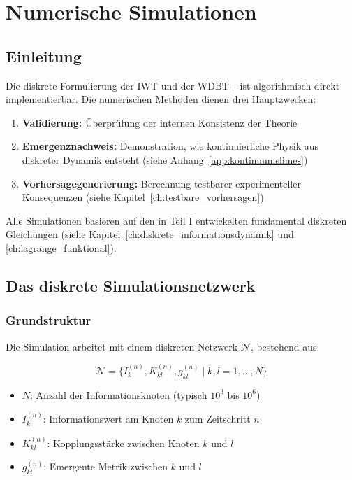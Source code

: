 
\chapter{Numerische Simulationen}
\label{app:numerik}

\section{Einleitung}
\label{app:numerik_einleitung}

Die diskrete Formulierung der IWT und der WDBT+ ist algorithmisch direkt implementierbar. Die numerischen Methoden dienen drei Hauptzwecken:

\begin{enumerate}
    \item \textbf{Validierung:} Überprüfung der internen Konsistenz der Theorie
    \item \textbf{Emergenznachweis:} Demonstration, wie kontinuierliche Physik aus diskreter Dynamik entsteht (siehe Anhang~\ref{app:kontinuumslimes})
    \item \textbf{Vorhersagegenerierung:} Berechnung testbarer experimenteller Konsequenzen (siehe Kapitel~\ref{ch:testbare_vorhersagen})
\end{enumerate}

Alle Simulationen basieren auf den in Teil I entwickelten fundamental diskreten Gleichungen (siehe Kapitel~\ref{ch:diskrete_informationsdynamik} und \ref{ch:lagrange_funktional}).

\section{Das diskrete Simulationsnetzwerk}
\label{app:numerik_netzwerk}

\subsection{Grundstruktur}
\label{sub:numerik_grundstruktur}

Die Simulation arbeitet mit einem diskreten Netzwerk \( \mathcal{N} \), bestehend aus:

\[
\mathcal{N} = \{ I_k^{(n)}, K_{kl}^{(n)}, g_{kl}^{(n)} \mid k, l = 1, \dots, N \}
\]

\begin{itemize}
    \item \( N \): Anzahl der Informationsknoten (typisch \( 10^3 \) bis \( 10^6 \))
    \item \( I_k^{(n)} \): Informationswert am Knoten \( k \) zum Zeitschritt \( n \)
    \item \( K_{kl}^{(n)} \): Kopplungsstärke zwischen Knoten \( k \) und \( l \)
    \item \( g_{kl}^{(n)} \): Emergente Metrik zwischen \( k \) und \( l \)
\end{itemize}


